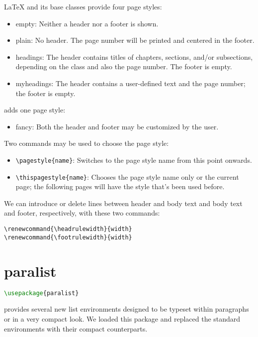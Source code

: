 LaTeX and its base classes provide four page styles:
\begin{itemize}
\item empty: Neither a header nor a footer is shown.
\item plain: No header. The page number will be printed and centered in the footer. 
\item headings: The header contains titles of chapters, sections, and/or subsections, depending on the class and also the page number. The footer is empty.
\item myheadings: The header contains a user-defined text and the page number; the footer is empty.
\end{itemize}

 adds one page style:
\begin{itemize}
\item fancy: Both the header and footer may be customized by the user.
\end{itemize}
 
Two commands may be used to choose the page style:
\begin{itemize}
\item \lstinline|\pagestyle{name}|: Switches to the page style name from this point onwards.
\item \lstinline|\thispagestyle{name}|: Chooses the page style name only or the current page; the following pages will have the style that's been used before.
\end{itemize}


We can introduce or delete lines between header and body text and body text and footer, respectively, with these two commands:
\begin{lstlisting}
\renewcommand{\headrulewidth}{width} 
\renewcommand{\footrulewidth}{width}
\end{lstlisting}


\section{paralist}
\label{sec:paralist}
\begin{lstlisting}[language=TeX]
\usepackage{paralist}
\end{lstlisting}

 provides several new list environments designed to be typeset within paragraphs or in a very compact look.
We loaded this package and replaced the standard environments with their compact counterparts.


